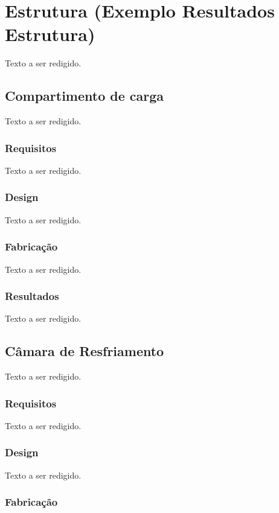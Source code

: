 \section{Estrutura (Exemplo Resultados Estrutura)}
Texto a ser redigido.

\subsection{Compartimento de carga}
                                                             Texto a ser redigido.

\subsubsection{Requisitos}

Texto a ser redigido.

\subsubsection{Design}

Texto a ser redigido.

\subsubsection{Fabricação}
Texto a ser redigido.

\subsubsection{Resultados}

Texto a ser redigido.

\subsection{Câmara de Resfriamento}

Texto a ser redigido.

\subsubsection{Requisitos}

Texto a ser redigido.

\subsubsection{Design}

Texto a ser redigido.

\subsubsection{Fabricação}

